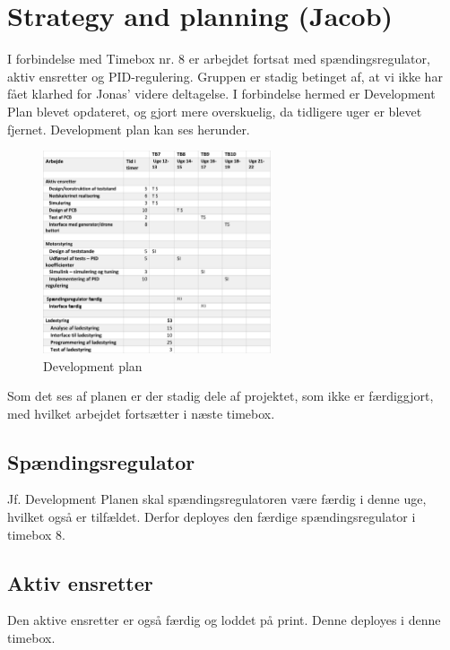 
\section{Strategy and planning (Jacob)}
\label{sec:strategy-planning}

I forbindelse med Timebox nr. 8 er arbejdet fortsat med spændingsregulator, aktiv ensretter og PID-regulering. Gruppen er stadig betinget af, at vi ikke har fået klarhed for Jonas’ videre deltagelse. I forbindelse hermed er Development Plan blevet opdateret, og gjort mere overskuelig, da tidligere uger er blevet fjernet. 
Development plan kan ses herunder. 

\begin{figure}[h]
  \centering
  \includegraphics[width=0.6\textwidth]{plan.pdf}
  \caption{Development plan}
  \label{fig:plan}
\end{figure}

Som det ses af planen er der stadig dele af projektet, som ikke er færdiggjort, med hvilket arbejdet fortsætter i næste timebox.

\subsection{Spændingsregulator}
\label{sec:spandingsregulator}
Jf. Development Planen skal spændingsregulatoren være færdig i denne uge, hvilket også er tilfældet. Derfor deployes den færdige spændingsregulator i timebox 8. 

\subsection{Aktiv ensretter}
\label{sec:aktiv-ensretter}
Den aktive ensretter er også færdig og loddet på print. Denne deployes i denne timebox. 

